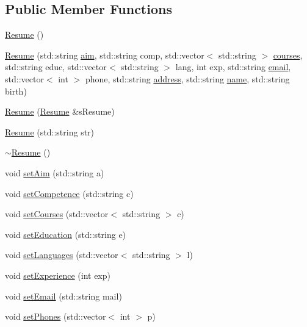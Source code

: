 \subsection*{Public Member Functions}
\begin{DoxyCompactItemize}
\item 
\hyperlink{class_resume_a71d23f61d7eb1560a918f6b3bf65fdc5}{Resume} ()
\item 
\hyperlink{class_resume_a92600ef21027117b53ab9d3fdb6705f5}{Resume} (std\+::string \hyperlink{class_resume_ace4b574b42cdc210ed457987c045410a}{aim}, std\+::string comp, std\+::vector$<$ std\+::string $>$ \hyperlink{class_resume_afae66c6c6d6c04b721dce001d25e2d35}{courses}, std\+::string educ, std\+::vector$<$ std\+::string $>$ lang, int exp, std\+::string \hyperlink{class_resume_a376e6779f0f414aec00ca78c36dd1c2a}{email}, std\+::vector$<$ int $>$ phone, std\+::string \hyperlink{class_resume_a31098a2b61a35edbf3c6a525235e5976}{address}, std\+::string \hyperlink{class_resume_ae99dd9e5aa53753a02b105478a76214a}{name}, std\+::string birth)
\item 
\hyperlink{class_resume_a6fc2de3d11d4650dd7720c344386c8a2}{Resume} (\hyperlink{class_resume}{Resume} \&s\+Resume)
\item 
\hyperlink{class_resume_a0da0b86ce16756cdfe0cc34afa77e975}{Resume} (std\+::string str)
\item 
\hyperlink{class_resume_a86b302420dc26041de719f14ce6e6621}{$\sim$\+Resume} ()
\item 
void \hyperlink{class_resume_a48d6e397c93b741a2fe96ba83f36c40f}{set\+Aim} (std\+::string a)
\item 
void \hyperlink{class_resume_adce5a6624de56751c72f8fe2989da5c9}{set\+Competence} (std\+::string c)
\item 
void \hyperlink{class_resume_a2a80b2496ae5bfbf456f4fe6170b9a21}{set\+Courses} (std\+::vector$<$ std\+::string $>$ c)
\item 
void \hyperlink{class_resume_a9a76b4b2d010ce5259b9be3ff9fca2b6}{set\+Education} (std\+::string e)
\item 
void \hyperlink{class_resume_ae51fc034e53ba1118f3d49b3bd0b1e0f}{set\+Languages} (std\+::vector$<$ std\+::string $>$ l)
\item 
void \hyperlink{class_resume_a3742ddd777e93ad124560cec7da409fa}{set\+Experience} (int exp)
\item 
void \hyperlink{class_resume_a35e1a0db9143d3fcdce851c2156b9060}{set\+Email} (std\+::string mail)
\item 
void \hyperlink{class_resume_a97ea87081895f4319f72aec9a3f4fd1c}{set\+Phones} (std\+::vector$<$ int $>$ p)

\end{DoxyCompactItemize}
